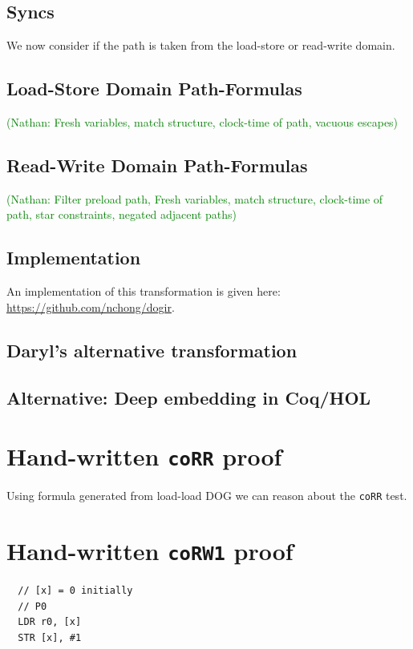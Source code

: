 \documentclass[10pt]{paper}
\newcommand{\litmus}[1]{\texttt{#1}}
\newcommand{\NCComment}[1]{\textcolor{green}{(Nathan: #1)}}
\begin{document}
\subsection{Syncs}

We now consider if the path is taken from the load-store or read-write domain.
%
\subsection{Load-Store Domain Path-Formulas}
%
\NCComment{Fresh variables, match structure, clock-time of path, vacuous escapes}

\subsection{Read-Write Domain Path-Formulas}
%
\NCComment{Filter preload path, Fresh variables, match structure, clock-time of path, star constraints, negated adjacent paths}

\subsection{Implementation}

An implementation of this transformation is given here: \url{https://github.com/nchong/dogir}.

\subsection{Daryl's alternative transformation}

\subsection{Alternative: Deep embedding in Coq/HOL}

\section{Hand-written \litmus{coRR} proof}
%
Using formula generated from load-load DOG we can reason about the \litmus{coRR} test.

\section{Hand-written \litmus{coRW1} proof}

\begin{verbatim}
  // [x] = 0 initially
  // P0
  LDR r0, [x]
  STR [x], #1
\end{verbatim}
\end{document}
